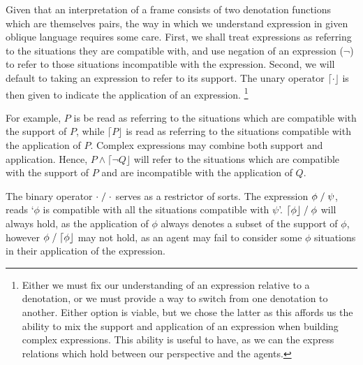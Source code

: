 \documentclass[10pt]{article}
\newcommand{\lattn}{\ensuremath{\lceil}}
\newcommand{\rattn}{\ensuremath{\rfloor}}
\newcommand{\attn}[1]{\ensuremath{\mathord{\lattn{#1}\rattn}}}
\def\ltrans{\mathrel{%
    /%
  }}
\begin{document}
Given that an interpretation of a frame consists of two denotation functions which are themselves pairs, the way in which we understand expression in given oblique language requires some care.
First, we shall treat expressions as referring to the situations they are compatible with, and use negation of an expression (\(\lnot\)) to refer to those situations incompatible with the expression.
Second, we will default to taking an expression to refer to its support.
The unary operator \(\attn{\cdot}\) is then given to indicate the application of an expression.\nolinebreak
\footnote{Either we must fix our understanding of an expression relative to a denotation, or we must provide a way to switch from one denotation to another.
  Either option is viable, but we chose the latter as this affords us the ability to mix the support and application of an expression when building complex expressions.
This ability is useful to have, as we can the express relations which hold between our perspective and the agents.}

For example, \(P\) is be read as referring to the situations which are compatible with the support of \(P\), while \(\attn{P}\) is read as referring to the situations compatible with the application of \(P\).
Complex expressions may combine both support and application.
Hence, \(P \land \attn{\lnot Q}\) will refer to the situations which are compatible with the support of \(P\) and are incompatible with the application of \(Q\).

The binary operator \(\cdot \ltrans \cdot\) serves as a restrictor of sorts.
The expression \(\phi \ltrans \psi\), reads `\(\phi\) is compatible with all the situations compatible with \(\psi\)'.
\(\attn{\phi} \ltrans \phi\) will always hold, as the application of \(\phi\) always denotes a subset of the support of \(\phi\), however \(\phi \ltrans \attn{\phi}\) may not hold, as an agent may fail to consider some \(\phi\) situations in their application of the expression.
\end{document}

